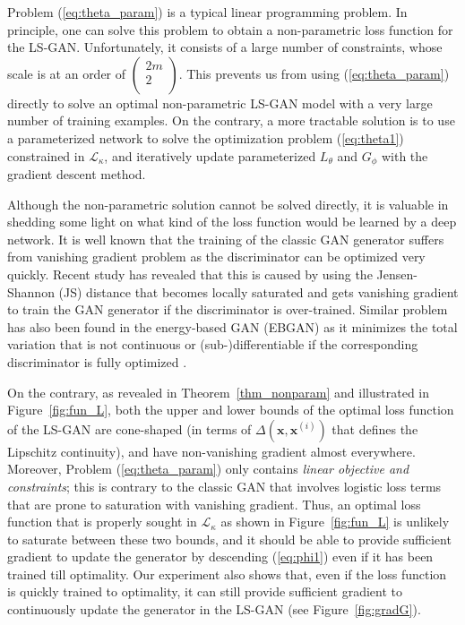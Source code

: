 \documentclass[11pt,fullpage, letterpaper,twoside]{article}
\newcommand{\1}[1]{\mathds{1}_{\left[#1\right]}}
\begin{document}
Problem (\ref{eq:theta_param}) is a typical linear programming problem. In principle, one can solve this problem to obtain a non-parametric loss function for the LS-GAN.
Unfortunately, it consists of a large number of constraints, whose scale is at an order of $\left( {\begin{array}{*{10}{c}}
   {2m}  \\
   2  \\
\end{array}} \right)$. This prevents us from using (\ref{eq:theta_param}) directly to solve an optimal non-parametric LS-GAN model with a very large number of training examples.
On the contrary, a more tractable solution is to use a parameterized network to solve the optimization problem (\ref{eq:theta1}) constrained in $\mathcal L_\kappa$, and iteratively update parameterized $L_\theta$ and $G_\phi$ with the gradient descent method.


Although the non-parametric solution cannot be solved directly, it is valuable in shedding some light on what kind of the loss function would be learned by a deep network. It is well known that the training of the classic GAN generator suffers from vanishing gradient problem as the discriminator can be optimized very quickly.  Recent study \cite{wgan17} has revealed that this is caused by using the Jensen-Shannon (JS) distance that becomes locally saturated and gets vanishing gradient to train the GAN generator if the discriminator is over-trained. Similar problem has also been found in the energy-based GAN (EBGAN) \cite{zhao2016energy} as it minimizes the total variation that is not continuous or (sub-)differentiable if the corresponding discriminator is fully optimized \cite{wgan17}.

On the contrary, as revealed in Theorem~\ref{thm_nonparam} and illustrated in Figure~\ref{fig:fun_L}, both the upper and lower bounds of the optimal loss function of the LS-GAN are cone-shaped (in terms of $\Delta(\mathbf x, \mathbf x^{(i)})$ that defines the Lipschitz continuity), and have non-vanishing gradient almost everywhere. Moreover, Problem (\ref{eq:theta_param}) only contains {\em linear objective and constraints}; this is contrary to the classic GAN that involves logistic loss terms that are prone to saturation with vanishing gradient. Thus, an optimal loss function that is properly sought in $\mathcal L_\kappa$ as shown in Figure~\ref{fig:fun_L} is unlikely to saturate between these two bounds, and it should be able to provide sufficient gradient to update the generator by descending (\ref{eq:phi1}) even if it has been trained till optimality. Our experiment also shows that, even if the loss function is quickly trained to optimality, it can still provide sufficient gradient to continuously update the generator in the LS-GAN (see Figure~\ref{fig:gradG}).
\end{document}
